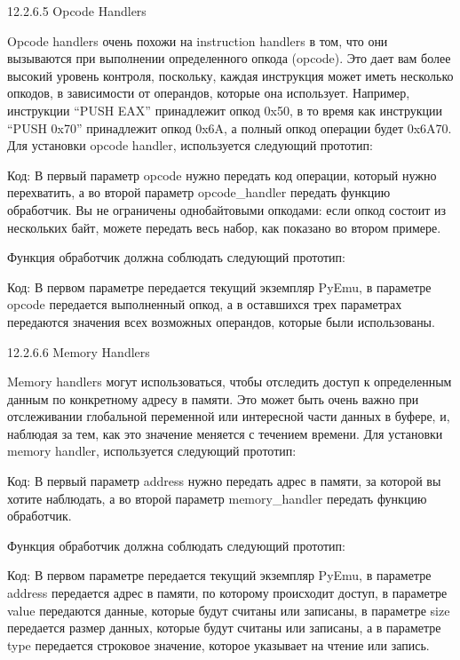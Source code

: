 \documentclass[12pt, a4paper, oneside]{book}
\begin{document}
12.2.6.5 Opcode Handlers

Opcode handlers очень похожи на instruction handlers в том, что они вызываются при выполнении определенного опкода (opcode). Это дает вам более высокий уровень контроля, поскольку, каждая инструкция может иметь несколько опкодов, в зависимости от операндов, которые она использует. Например, инструкции “PUSH EAX” принадлежит опкод 0x50, в то время как инструкции “PUSH 0x70” принадлежит опкод 0x6A, а полный опкод операции будет 0x6A70. Для установки opcode handler, используется следующий прототип:

Код:
В первый параметр opcode нужно передать код операции, который нужно перехватить, а во второй параметр opcode\_handler передать функцию обработчик. Вы не ограничены однобайтовыми опкодами: если опкод состоит из нескольких байт, можете передать весь набор, как показано во втором примере. 

Функция обработчик должна соблюдать следующий прототип:

Код:
В первом параметре передается текущий экземпляр PyEmu, в параметре opcode передается выполненный опкод, а в оставшихся трех параметрах передаются значения всех возможных операндов, которые были использованы. 

12.2.6.6 Memory Handlers

Memory handlers могут использоваться, чтобы отследить доступ к определенным данным по конкретному адресу в памяти. Это может быть очень важно при отслеживании глобальной переменной или интересной части данных в буфере, и, наблюдая за тем, как это значение меняется с течением времени. Для установки memory handler, используется следующий прототип:

Код:
В первый параметр address нужно передать адрес в памяти, за которой вы хотите наблюдать, а во второй параметр memory\_handler передать функцию обработчик.

Функция обработчик должна соблюдать следующий прототип:

Код:
В первом параметре передается текущий экземпляр PyEmu, в параметре address передается адрес в памяти, по которому происходит доступ, в параметре value передаются данные, которые будут считаны или записаны, в параметре size передается размер данных, которые будут считаны или записаны, а в параметре type передается строковое значение, которое указывает на чтение или запись.
\end{document}

